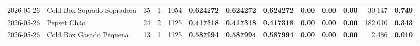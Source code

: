 {\begin{center}
{\begin{tabular}{@{}llrrrrrrrrrrr@{}}
2026-05-26 & Cold Box Soprado Sopradora & 35 & 1 & 1054 & \textbf{0.624272} & \textbf{0.624272} & \textbf{0.624272} & \textbf{0.00} & \textbf{0.00} & \textbf{0.00} & 30.147 & \textbf{0.749} \\
2026-05-26 & Pepset Chão & 24 & 2 & 1125 & \textbf{0.417318} & \textbf{0.417318} & \textbf{0.417318} & \textbf{0.00} & \textbf{0.00} & \textbf{0.00} & 182.010 & \textbf{0.343} \\
2026-05-26 & Cold Box Gasado Pequena & 13 & 1 & 1125 & \textbf{0.587994} & \textbf{0.587994} & \textbf{0.587994} & \textbf{0.00} & \textbf{0.00} & \textbf{0.00} & 2.486 & \textbf{0.010} \\
\bottomrule
\end{tabular}%
}
\end{center}
}
\vspace*{\fill}
\newpage
\vspace*{\fill}
